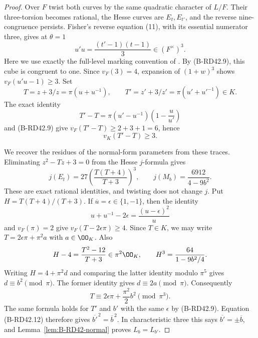 \begin{proof}
Over $F$ twist both curves by the same quadratic character of $L/F$.
Their three-torsion becomes rational, the Hesse curves are $E_t,E_{t'}$,
and the reverse nine-congruence persists. Fisher's reverse equation
(11), with its essential numerator three, gives at $\theta=1$
\[
                          u'u=\frac{(t'-1)(t-1)}3
                                    \in(F^\times)^3.
                                                        \tag{B-RD42.10}
\]
Here we use exactly the full-level marking convention of
\citet[Section~2, pp.~4--5; Theorem~4.3 and its proof, pp.~9--10]
{Fisher2015Nine}. By (B-RD42.9), this cube is congruent to one.
Since $v_F(3)=4$, expansion of $(1+w)^3$ shows
$v_F(u'u-1)\ge3$. Set
\[
 T=z+3/z=\pi(u+u^{-1}),\qquad
 T'=z'+3/z'=\pi(u'+u'^{-1})\in K.
\]
The exact identity
\[
       T'-T=\pi(u'-u^{-1})\left(1-\frac u{u'}\right)
                                                        \tag{B-RD42.11}
\]
and (B-RD42.9) give $v_F(T'-T)\ge2+3+1=6$, hence
\[
                              v_K(T'-T)\ge3.
                                                        \tag{B-RD42.12}
\]

We recover the residues of the normal-form parameters from these
traces. Eliminating $z^2-Tz+3=0$ from the Hesse $j$-formula gives
\[
 j(E_t)=27\left(\frac{T(T+4)}{T+3}\right)^3,
 \qquad
 j(M_b)=\frac{6912}{4-9b^2}.
                                                        \tag{B-RD42.13}
\]
These are exact rational identities, and twisting does not change
$j$. Put $H=T(T+4)/(T+3)$. If $\overline u=\epsilon\in\{1,-1\}$,
then the identity
\[
 u+u^{-1}-2\epsilon=\frac{(u-\epsilon)^2}{u}
\]
and $v_F(\pi)=2$ give $v_F(T-2\epsilon\pi)\ge4$. Since
$T\in K$, we may write $T=2\epsilon\pi+\pi^2a$ with
$a\in\OO_K$. Also
\[
 H-4=\frac{T^2-12}{T+3}\in\pi^2\OO_K,\qquad
 H^3=\frac{64}{1-9b^2/4}.
\]
Writing $H=4+\pi^2d$ and comparing the latter identity modulo
$\pi^5$ gives $d\equiv b^2\pmod\pi$. The former identity gives
$d\equiv2a\pmod\pi$. Consequently
\[
                T\equiv2\epsilon\pi+\frac{\pi^2}{2}b^2
                                      \pmod{\pi^3}.
                                                        \tag{B-RD42.14}
\]
The same formula holds for $T'$ and $b'$ with the same $\epsilon$
by (B-RD42.9). Equation (B-RD42.12) therefore gives
$\overline{b'}^{\,2}=\overline b^{\,2}$. In characteristic three
this says $\overline{b'}=\pm\overline b$, and
Lemma~\ref{lem:B-RD42-normal} proves $L_b=L_{b'}$.
\end{proof}

